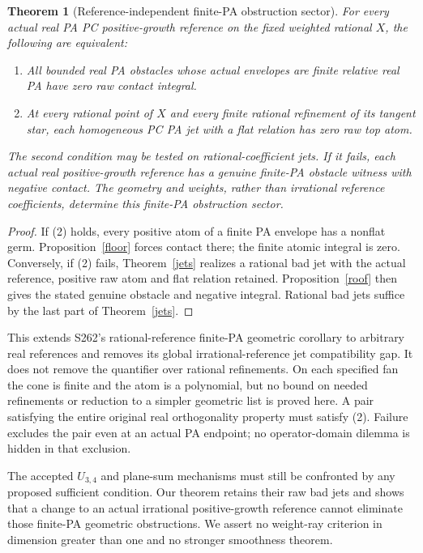 \documentclass[11pt]{article}
\newtheorem{theorem}{Theorem}
\begin{document}
\begin{theorem}[Reference-independent finite-PA obstruction sector]\label{criterion}
For \emph{every actual} real PA PC positive-growth reference on the
fixed weighted rational $X$, the following are equivalent:
\begin{enumerate}
\item All bounded real PA obstacles whose actual envelopes are
finite relative real PA have zero raw contact integral.
\item At every rational point of $X$ and every finite rational
refinement of its tangent star, each homogeneous PC PA jet
with a flat relation has zero raw top atom.
\end{enumerate}
The second condition may be tested on rational-coefficient jets.
If it fails, \emph{each actual real positive-growth reference}
has a genuine finite-PA obstacle witness with negative contact.
The geometry and weights, rather than irrational reference
coefficients, determine this finite-PA obstruction sector.
\end{theorem}
\begin{proof}
If (2) holds, every positive atom of a finite PA envelope has
a nonflat germ. Proposition~\ref{floor} forces contact there;
the finite atomic integral is zero. Conversely, if (2) fails,
Theorem~\ref{jets} realizes a rational bad jet with the actual
reference, positive raw atom and flat relation retained.
Proposition~\ref{roof} then gives the stated genuine obstacle
and negative integral. Rational bad jets suffice by the
last part of Theorem~\ref{jets}.
\end{proof}

This extends S262's rational-reference finite-PA geometric
corollary to arbitrary real references and removes its global
irrational-reference jet compatibility gap. It does not remove
the quantifier over rational refinements. On each specified fan
the cone is finite and the atom is a polynomial, but no bound
on needed refinements or reduction to a simpler geometric list
is proved here. A pair satisfying the entire original real
orthogonality property must satisfy (2). Failure excludes the
pair even at an actual PA endpoint; no operator-domain dilemma
is hidden in that exclusion.

The accepted $U_{3,4}$ and plane-sum mechanisms must still be
confronted by any proposed sufficient condition. Our theorem
retains their raw bad jets and shows that a change to an actual
irrational positive-growth reference cannot eliminate those
finite-PA geometric obstructions. We assert no weight-ray
criterion in dimension greater than one and no stronger
smoothness theorem.
\end{document}
